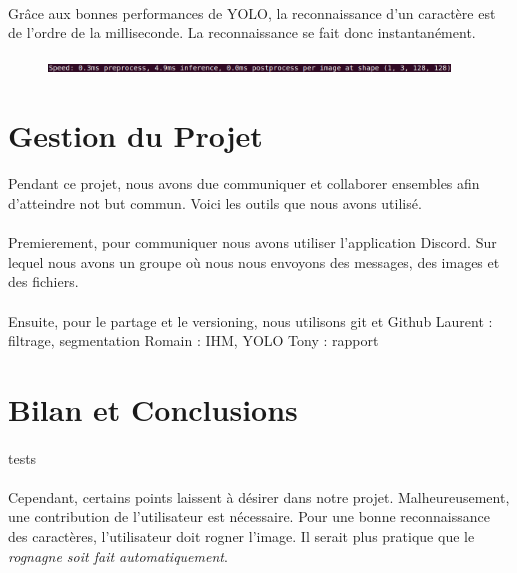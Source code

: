 \documentclass[a4paper]{article}
\begin{document}
			\paragraph{} Grâce aux bonnes performances de YOLO, la reconnaissance d'un caractère est de l'ordre de la milliseconde. La reconnaissance se fait donc instantanément.

			\begin{figure}[h]
				\centering
				\includegraphics[width=0.95\textwidth]{speedYOLO.png}
				\caption{}
				\label{fig:speedYOLO}
			\end{figure}

	\section{Gestion du Projet}
		\paragraph{} Pendant ce projet, nous avons due communiquer et collaborer ensembles afin d'atteindre not but commun. Voici les outils que nous avons utilisé.
		\paragraph{} Premierement, pour communiquer nous avons utiliser l'application Discord. Sur lequel nous avons un groupe où nous nous envoyons des messages, des images et des fichiers.
		\paragraph{} Ensuite, pour le partage et le versioning, nous utilisons git et Github
		Laurent : filtrage, segmentation
		Romain : IHM, YOLO
		Tony : rapport
	\section*{Bilan et Conclusions}%
		\paragraph{}
			tests
		\paragraph{}
			Cependant, certains points laissent à désirer dans notre projet. Malheureusement, une contribution de l'utilisateur est nécessaire. Pour une bonne reconnaissance des caractères, l'utilisateur doit rogner l'image. Il serait plus pratique que le \emph{rognagne soit fait automatiquement}. 
\end{document}
